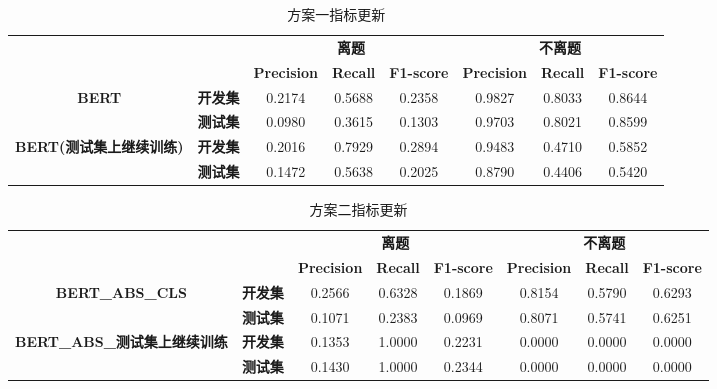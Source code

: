 \documentclass[11pt]{article}
\begin{document}
\begin{CJK}{UTF8}{gkai}
\begin{table}[htbp]\small
  \centering
  \begin{tabular}{cccccccc}
    \hline
    \multicolumn{2}{c}{\multirow{2}[0]{*}{}} & \multicolumn{3}{p{16.94em}}{\textbf{离题}} & \multicolumn{3}{p{12.57em}}{\textbf{不离题}} \\
    \multicolumn{2}{c}{} & \multicolumn{1}{p{5.625em}}{\textbf{Precision}} & \multicolumn{1}{p{5.375em}}{\textbf{Recall}} & \multicolumn{1}{p{5.94em}}{\textbf{F1-score}} & \multicolumn{1}{p{4.19em}}{\textbf{Precision}} & \multicolumn{1}{p{4.19em}}{\textbf{Recall}} & \multicolumn{1}{p{4.19em}}{\textbf{F1-score}} \\
    \hline
    \multicolumn{1}{c}{\multirow{2}[0]{*}{\textbf{BERT}}} & \textbf{开发集} & 0.2174  & 0.5688  & 0.2358  & 0.9827  & 0.8033  & 0.8644  \\
    & \textbf{测试集} & 0.0980  & 0.3615  & 0.1303  & 0.9703  & 0.8021  & 0.8599  \\
    \hline
    \multicolumn{1}{c}{\multirow{2}[0]{*}{\textbf{BERT(测试集上继续训练)}}} & \textbf{开发集} & 0.2016  & 0.7929  & 0.2894  & 0.9483  & 0.4710  & 0.5852  \\
    & \textbf{测试集} & 0.1472  & 0.5638  & 0.2025  & 0.8790  & 0.4406  & 0.5420  \\
    \hline
  \end{tabular}%
  \caption{方案一指标更新}
  \label{tab:addlabel}%
\end{table}%

\begin{table}[htbp]\small
  \centering
    \begin{tabular}{cccccccc}
      \hline
      \multicolumn{2}{c}{\multirow{2}[0]{*}{}} & \multicolumn{3}{p{12.57em}}{\textbf{离题}} & \multicolumn{3}{p{12.57em}}{\textbf{不离题}} \\
      \multicolumn{2}{c}{} & \multicolumn{1}{p{4.19em}}{\textbf{Precision}} & \multicolumn{1}{p{4.19em}}{\textbf{Recall}} & \multicolumn{1}{p{4.19em}}{\textbf{F1-score}} & \multicolumn{1}{p{4.19em}}{\textbf{Precision}} & \multicolumn{1}{p{4.19em}}{\textbf{Recall}} & \multicolumn{1}{p{4.19em}}{\textbf{F1-score}} \\
      \hline
      \multicolumn{1}{c}{\multirow{2}[0]{*}{\textbf{BERT\_ABS\_CLS}}} & \textbf{开发集} & 0.2566  & 0.6328  & 0.1869  & 0.8154  & 0.5790  & 0.6293  \\
      & \textbf{测试集} & 0.1071  & 0.2383  & 0.0969  & 0.8071  & 0.5741  & 0.6251  \\
      \hline
      \multicolumn{1}{c}{\multirow{2}[0]{*}{\textbf{BERT\_ABS\_测试集上继续训练}}} & \textbf{开发集} & 0.1353  & 1.0000  & 0.2231  & 0.0000  & 0.0000  & 0.0000  \\
      & \textbf{测试集} & 0.1430  & 1.0000  & 0.2344  & 0.0000  & 0.0000  & 0.0000  \\
      \hline
    \end{tabular}%
    \caption{方案二指标更新}
  \label{tab:addlabel}%
\end{table}%



\end{CJK}
\end{document}
